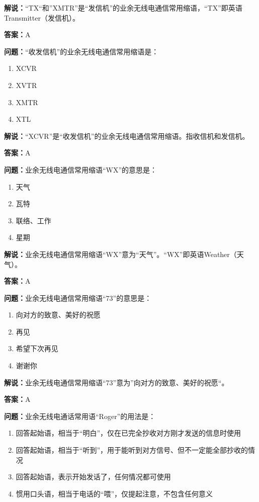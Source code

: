 \textbf{解说：}“TX“和”XMTR”是“发信机”的业余无线电通信常用缩语，“TX”即英语Transmitter（发信机）。

\textbf{答案：}A

\textbf{问题：}“收发信机”的业余无线电通信常用缩语是：

\begin{enumerate}[label=\Alph*), leftmargin=1cm]
	\item XCVR
	\item XVTR
	\item XMTR
	\item XTL
\end{enumerate}

\textbf{解说：}“XCVR”是“收发信机”的业余无线电通信常用缩语。指收信机和发信机。

\textbf{答案：}A

\textbf{问题：}业余无线电通信常用缩语“WX”的意思是：

\begin{enumerate}[label=\Alph*), leftmargin=1cm]
	\item 天气
	\item 瓦特
	\item 联络、工作
	\item 星期
\end{enumerate}

\textbf{解说：}业余无线电通信常用缩语“WX”意为“天气”。“WX”即英语Weather（天气）。

\textbf{答案：}A

\textbf{问题：}业余无线电通信常用缩语“73”的意思是：

\begin{enumerate}[label=\Alph*), leftmargin=1cm]
	\item 向对方的致意、美好的祝愿
	\item 再见
	\item 希望下次再见
	\item 谢谢你
\end{enumerate}

\textbf{解说：}业余无线电通信常用缩语“73”意为”向对方的致意、美好的祝愿“。

\textbf{答案：}A

\textbf{问题：}业余无线电通话常用语“Roger”的用法是：

\begin{enumerate}[label=\Alph*), leftmargin=1cm]
	\item 回答起始语，相当于“明白”，仅在已完全抄收对方刚才发送的信息时使用
	\item 回答起始语，相当于“听到”，用于能听到对方信号、但不一定能全部抄收的情况
	\item 回答起始语，表示开始发话了，任何情况都可使用
	\item 惯用口头语，相当于电话的“喂”，仅提起注意，不包含任何意义
\end{enumerate}

